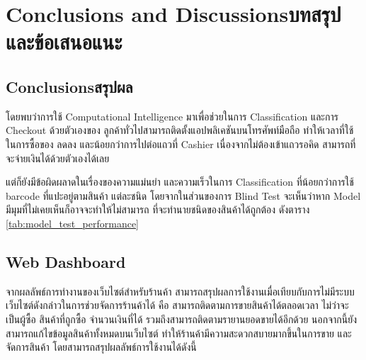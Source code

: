 \chapter{\ifenglish Conclusions and Discussions\else บทสรุปและข้อเสนอแนะ\fi}

\section{\ifenglish Conclusions\else สรุปผล\fi}
โดยพบว่าการใช้ Computational Intelligence มาเพื่อช่วยในการ Classification และการ Checkout ด้วยตัวเองของ  ลูกค้าทั่วไปสามารถติดตั้งแอปพลิเคชันบนโทรศัพท์มือถือ
ทำให้เวลาที่ใช้ในการซื้อของ ลดลง และน้อยกว่าการไปต่อแถวที่ Cashier เนื่องจากไม่ต้องเข้าแถวรอคิด สามารถที่จะจ่ายเงินได้ด้วยตัวเองได้เลย

แต่ก็ยังมีข้อผิดผลาดในเรื่องของความแม่นยำ และความเร็วในการ Classification ที่น้อยกว่าการใช้ barcode ที่แปะอยู่ตามสินค้า แต่ละชนิด
โดยจากในส่วนของการ Blind Test  จะเห็นว่าหาก Model มีมุมที่ไม่เคยเห็นก็อาจจะทำให้ไม่สามารถ ที่จะทำนายชนิดของสินค้าได้ถูกต้อง 
ดังตาราง \ref{tab:model_test_performance}

\section{Web Dashboard}
จากผลลัพธ์การทำงานของเว็บไซต์สำหรับร้านค้า สามารถสรุปผลการใช้งานเมื่อเทียบกับการไม่มีระบบเว็บไซต์ดังกล่าวในการช่วยจัดการร้านค้าได้ คือ สามารถติดตามการขายสินค้าได้ตลอดเวลา ไม่ว่าจะเป็นผู้ซื้อ สินค้าที่ถูกซื้อ จำนวนเงินที่ได้ รวมถึงสามารถติดตามรายานยอดขายได้อีกด้วย นอกจากนี้ยังสามารถแก้ไขข้อมูลสินค้าทั้งหมดบนเว็บไซต์ ทำให้ร้านค้ามีความสะดวกสบายมากขึ้นในการขาย และจัดการสินค้า โดยสามารถสรุปผลลัพธ์การใช้งานได้ดังนี้


